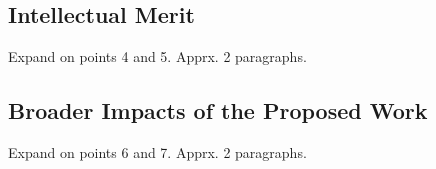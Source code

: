 \subsection{Intellectual Merit} 
Expand on points 4 and 5. Apprx. 2 paragraphs.
\subsection{Broader Impacts of the Proposed Work} 
Expand on points 6 and 7. Apprx. 2 paragraphs.
